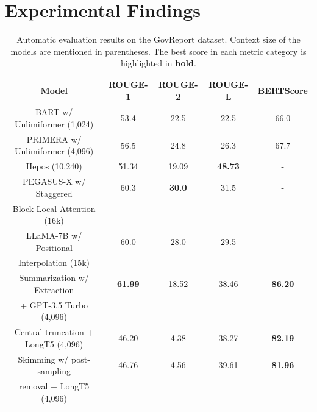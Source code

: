 \section{Experimental Findings}
	\label{sec:findings}


	\begin{table}[!ht]
		\centering

		\begin{tabular}{c c c c c}
			\hline
			Model & ROUGE-1 & ROUGE-2 & ROUGE-L & BERTScore \\
			\hline
			BART w/ Unlimiformer (1,024) & 53.4 & 22.5 & 22.5 & 66.0 \\
			PRIMERA w/ Unlimiformer (4,096) & 56.5 & 24.8 & 26.3 & 67.7 \\
			Hepos (10,240) & 51.34 & 19.09 & \textbf{48.73} & - \\
			PEGASUS-X w/ Staggered & 60.3 & \textbf{30.0} & 31.5 & - \\
			Block-Local Attention (16k) & & & & \\
			LLaMA-7B w/ Positional & 60.0 & 28.0 & 29.5 & - \\
			Interpolation (15k) & & & & \\
			\hline
			Summarization w/ Extraction & \textbf{61.99} & 18.52 & 38.46 & \textbf{86.20} \\
			+ GPT-3.5 Turbo (4,096) & & & & \\
			Central truncation + LongT5 (4,096) & 46.20 & 4.38 & 38.27 & \textbf{82.19} \\
			Skimming w/ post-sampling & 46.76 & 4.56 & 39.61 & \textbf{81.96} \\
			removal + LongT5 (4,096) & & & & \\
			\hline
		\end{tabular}

		\caption{Automatic evaluation results on the GovReport dataset. Context size of the models are
		mentioned in parentheses. The best score in each metric category is highlighted in \textbf{bold}.}
		\label{tab:govreport}
	\end{table}

